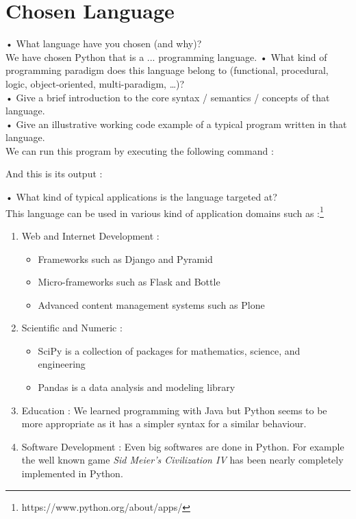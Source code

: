 \section{Chosen Language}
•	What language have you chosen (and why)?\\
We have chosen Python that is a ... programming language.
•	What kind of programming paradigm does this language belong to (functional, procedural, logic, object-oriented, multi-paradigm, …)?\\
•	Give a brief introduction to the core syntax / semantics / concepts of that language.\\
•	Give an illustrative working code example of a typical program written in that language.\\




We can run this program by executing the following command :



And this is its output :


•	What kind of typical applications is the language targeted at?\\
This language can be used in various kind of application domains such as :\footnote{https://www.python.org/about/apps/}
\begin{enumerate}
    \item{Web and Internet Development : 
        \begin{itemize}
            \item Frameworks such as Django and Pyramid
            \item Micro-frameworks such as Flask and Bottle
            \item Advanced content management systems such as Plone
        \end{itemize}
    }
    \item{Scientific and Numeric :
        \begin{itemize}
            \item SciPy is a collection of packages for mathematics, science, and engineering
            \item Pandas is a data analysis and modeling library
        \end{itemize}
    
    }
    \item{Education : We learned programming with Java but Python seems to be more appropriate as it has a simpler syntax for a similar behaviour.}
    \item{Software Development : Even big softwares are done in Python. For example the well known game \emph{Sid Meier's Civilization IV} has been nearly completely implemented in Python.}
\end{enumerate}